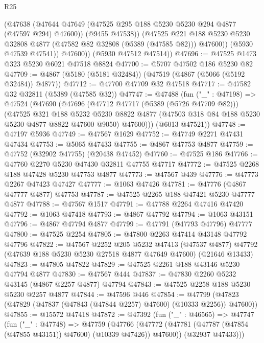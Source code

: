 \begin{lexlean}{R25}
\begin{coremodule}
              (@47638
                (@47644 @47649 (@47525 @295 @188 @5230 @5230 @294 @4877 (@47597 @294) @47600))
                (@9455 @47538))
              (@47525
                @221
                @188
                @5230
                @5230
                @32808
                @4877
                (@47582 @82 @32808 (@5389 (@47585 @82)))
                @47600))
            (@5930 @47539 @47541))
          @47600))
      (@5930 @47512 @47514))
@47696 := @47525 @1473 @323 @5230 @6021 @47518 @8824
@47700 := @5707 @47502 @186 @5230 @82
@47709 := @4867 (@5180 (@5181 @32484)) (@47519 (@4867 (@5066 (@5192 @32484)) @4877))
@47712 := @47700 @47709 @32 @47518
@47717 := @47582 @32 @32811 (@5389 (@47585 @32))
@47747 := @47488
    (fun ("_" : @47198) =>
    @47524
      (@47690
        (@47696
          (@47712 @47717 (@5389 (@5726 @47709 @82)))
          (@47525
            @321
            @188
            @5232
            @5230
            @8822
            @4877
            (@47503 @318 @84 @188 @5230 @5230 @4877 @8822 @47600 @9050)
            @47600)))
      (@6013 @47521))
@47748 := @47197 @5936
@47749 := @47567 @1629
@47752 := @47749 @2271 @47431 @47434
@47753 := @5065 @47433
@47755 := @4867 @47753 @4877
@47759 := @47752 (@32902 @47755) (@20438 @47452)
@47760 := @47525 @186
@47766 := @47760 @2270 @5230 @47430 @32811 @47755 @47717
@47772 := @47525 @2268 @188 @47428 @5230 @47753 @4877
@47773 := @47567 @439
@47776 := @47773 @2267 @47423 @47427
@47777 := @1063 @47426
@47781 := @47776 (@4867 @47777 @4877) @47753
@47787 := @47525 @2265 @188 @47421 @5230 @47777 @4877
@47788 := @47567 @1517
@47791 := @47788 @2264 @47416 @47420
@47792 := @1063 @47418
@47793 := @4867 @47792
@47794 := @1063 @43151
@47796 := @4867 @47794 @4877
@47799 := @47791 (@47793 @47796) @47777
@47800 := @47525 @2254
@47805 := @47800 @2263 @47414 @43148 @47792 @47796
@47822 := @47567
    @2252
    @205
    @5232
    @47413
    (@47537 @4877)
    @47792
    (@47639 @188 @5230 @5230 @27518 @4877 @47649 @47600)
    (@21646 @13433)
@47823 := @47805 @47822
@47829 := @47525 @2261 @188 @43146 @5230 @47794 @4877
@47830 := @47567 @444
@47837 := @47830 @2260 @5232 @43145 (@4867 @2257 @4877) @47794
@47843 := @47525 @2258 @188 @5230 @5230 @2257 @4877
@47844 := @47596 @446
@47854 := @47799 (@47823 (@47829 (@47837 (@47843 (@47844 @2257) @47600) (@10333 @2256)) @47600))
@47855 := @15572 @47418
@47872 := @47392
    (fun ("_" : @46565) =>
    @47747
      (fun ("_" : @47748) =>
      @47759
        (@47766 (@47772 (@47781 (@47787 (@47854 (@47855 @43151)) @47600) (@10339 @47426)) @47600))
        (@32937 @47433)))

\end{coremodule}
\end{lexlean}

